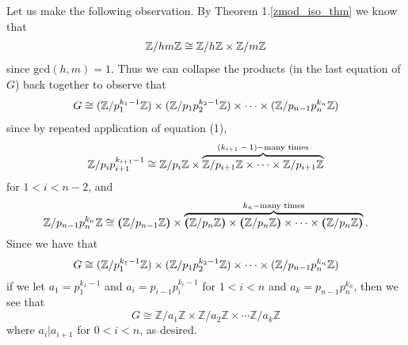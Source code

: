\begin{prf}
    Let us make the following observation. By Theorem
    1.\ref{zmod_iso_thm} we know that 
    \setcounter{equation}{0}
    \begin{align}
        \mathbb{Z}/hm\mathbb{Z} \cong \mathbb{Z}/h\mathbb{Z} \times \mathbb{Z}/m\mathbb{Z}       
    \end{align}
    since $\mbox{gcd}(h, m) = 1$.
    Thus we can collapse the products (in the last equation of $G$) 
    back together to observe that 
    \begin{align*}
        G \cong (\mathbb{Z}/p_1^{k_1 - 1}\mathbb{Z})
        \times (\mathbb{Z}/p_1p_2^{k_2-1}\mathbb{Z}) \times \cdots
        \times (\mathbb{Z}/p_{n-1}p_n^{k_n}\mathbb{Z})
    \end{align*}
    since by repeated application of equation (1), 
    \[
        \mathbb{Z}/p_ip_{i+1}^{k_{i+1} - 1} \cong \mathbb{Z}/p_i\mathbb{Z}\times \overbrace{\mathbb{Z}/p_{i + 1}\mathbb{Z} \times \cdots \times \mathbb{Z}/p_{i + 1}\mathbb{Z}}^\text{$(k_{i+1} - 1)-$many times}        
    \]
    for $1 < i < n -2$, and 
    \[
        \mathbb{Z}/p_{n-1}p_n^{k_n}\mathbb{Z} \cong \textbf{(}\mathbb{Z}/p_{n-1}\mathbb{Z}\textbf{)} \times
    \overbrace{\textbf{(}\mathbb{Z}/p_n\mathbb{Z\textbf{)}} \times \textbf{(}\mathbb{Z}/p_n\mathbb{Z}\textbf{)} \times \cdots \times \textbf{(}\mathbb{Z}/p_n\mathbb{Z}\textbf{)}}^\text{$k_n-$many times}.
    \]
    Since we have that 
    \[
        G \cong (\mathbb{Z}/p_1^{k_1 - 1}\mathbb{Z})
        \times (\mathbb{Z}/p_1p_2^{k_2-1}\mathbb{Z}) \times \cdots
        \times (\mathbb{Z}/p_{n-1}p_n^{k_n}\mathbb{Z})
    \]
    if we let $a_1 = p_1^{k_1 - 1}$ and 
    $a_i = p_{i-1}p_{i}^{k_{i} - 1}$ for $1 < i < n$ and $a_k =
    p_{n-1}p_n^{k_n}$, then we see that 
    \[
      G \cong  \mathbb{Z}/a_1\mathbb{Z} \times \mathbb{Z}/a_2\mathbb{Z} \times \cdots \mathbb{Z} / a_k \mathbb{Z} 
    \]
    where $a_i \big| a_{i + 1}$ for $0 < i < n$, as desired.
    \end{prf}
